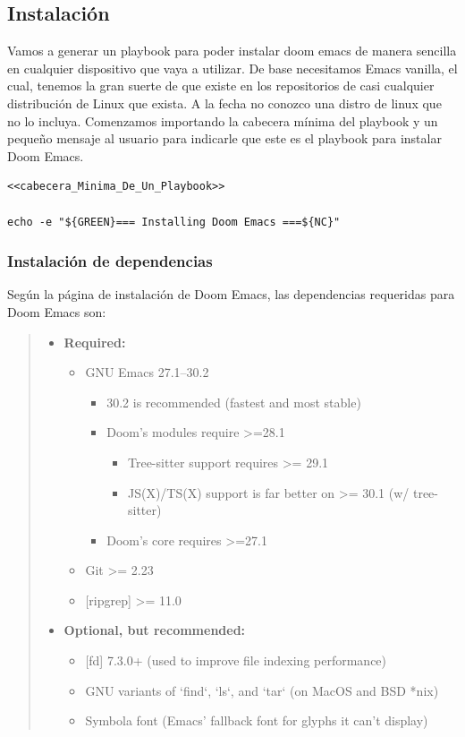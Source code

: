 \documentclass[11pt]{article}
\begin{document}
\subsection{Instalación}
\label{sec:org4134802}
Vamos a generar un playbook para poder instalar doom emacs de manera sencilla en cualquier dispositivo que vaya a utilizar.
De base necesitamos Emacs vanilla, el cual, tenemos la gran suerte de que existe en los repositorios de casi cualquier distribución de Linux que exista. A la fecha no conozco una distro de linux que no lo incluya.
Comenzamos importando la cabecera mínima del playbook y un pequeño mensaje al usuario para indicarle que este es el playbook para instalar Doom Emacs.

\begin{verbatim}
<<cabecera_Minima_De_Un_Playbook>>

echo -e "${GREEN}=== Installing Doom Emacs ===${NC}"

\end{verbatim}
\subsubsection{Instalación de dependencias}
\label{sec:orgca78232}

Según la página de instalación de Doom Emacs, las dependencias requeridas para Doom Emacs son:
\begin{quote}
\begin{itemize}
\item \textbf{\textbf{Required:}}
\begin{itemize}
\item GNU Emacs 27.1–30.2
\begin{itemize}
\item 30.2 is recommended (fastest and most stable)
\item Doom's modules require >=28.1
\begin{itemize}
\item Tree-sitter support requires >= 29.1
\item JS(X)/TS(X) support is far better on >= 30.1 (w/ tree-sitter)
\end{itemize}
\item Doom's core requires >=27.1
\end{itemize}
\item Git >= 2.23
\item {[}ripgrep] >= 11.0
\end{itemize}
\item \textbf{\textbf{Optional, but recommended:}}
\begin{itemize}
\item {[}fd] 7.3.0+ (used to improve file indexing performance)
\item GNU variants of `find`, `ls`, and `tar` (on MacOS and BSD *nix)
\item Symbola font (Emacs' fallback font for glyphs it can't display)
\end{itemize}
\end{itemize}
\end{quote}
\end{document}
